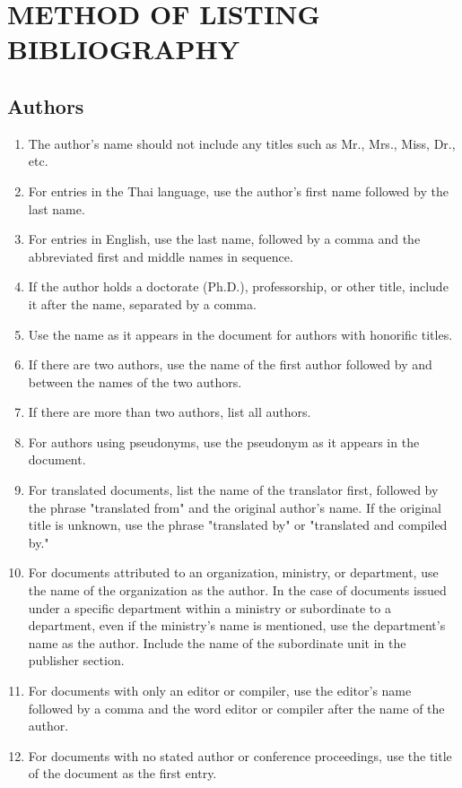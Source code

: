 \section{METHOD OF LISTING BIBLIOGRAPHY}

\subsection{Authors}

\begin{enumerate}
    \item The author's name should not include any titles such as Mr., Mrs., Miss, Dr., etc.
    \item For entries in the Thai language, use the author's first name followed by the last name.
    \item For entries in English, use the last name, followed by a comma and the abbreviated first and middle names in sequence.
    \item If the author holds a doctorate (Ph.D.), professorship, or other title, include it after the name, separated by a comma.
    \item Use the name as it appears in the document for authors with honorific titles.
    \item If there are two authors, use the name of the first author followed by and between the names of the two authors.
    \item If there are more than two authors, list all authors.
    \item For authors using pseudonyms, use the pseudonym as it appears in the document.
    \item For translated documents, list the name of the translator first, followed by the phrase "translated from" and the original author's name. If the original title is unknown, use the phrase "translated by" or "translated and compiled by."
    \item For documents attributed to an organization, ministry, or department, use the name of the organization as the author. In the case of documents issued under a specific department within a ministry or subordinate to a department, even if the ministry's name is mentioned, use the department's name as the author. Include the name of the subordinate unit in the publisher section.
    \item For documents with only an editor or compiler, use the editor's name followed by a comma and the word editor or compiler after the name of the author.
    \item For documents with no stated author or conference proceedings, use the title of the document as the first entry.
\end{enumerate}

